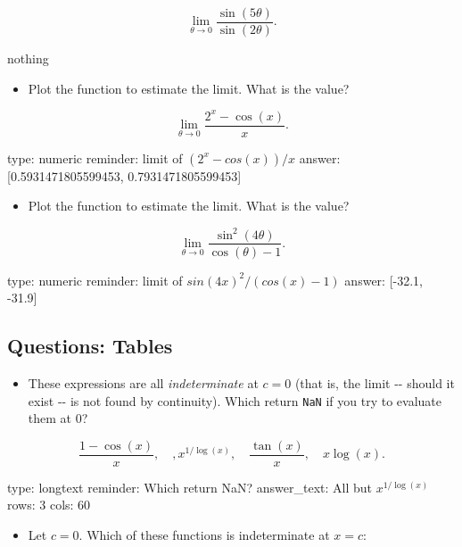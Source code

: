 \documentclass[12pt]{article}
\begin{document}
\[
\lim_{\theta \rightarrow 0} \frac{\sin(5\theta)}{\sin(2\theta)}.
\]

nothing
\begin{itemize}
\itemsep1pt\parskip0pt
\item
  Plot the function to estimate the limit. What is the value?
\end{itemize}

\[
\lim_{\theta \rightarrow 0} \frac{2^x - \cos(x)}{x}.
\]

\begin{answer}
    type: numeric
    reminder: limit of \( (2^x  - cos(x))/x \)
    answer: [0.5931471805599453, 0.7931471805599453]

\end{answer}

\begin{itemize}
\itemsep1pt\parskip0pt
\item
  Plot the function to estimate the limit. What is the value?
\end{itemize}

\[
\lim_{\theta \rightarrow 0} \frac{\sin^2(4\theta)}{\cos(\theta) - 1}.
\]

\begin{answer}
    type: numeric
    reminder: limit of \( sin(4x)^2 / (cos(x) - 1) \)
    answer: [-32.1, -31.9]

\end{answer}

\subsection{Questions: Tables}

\begin{itemize}
\itemsep1pt\parskip0pt
\item
  These expressions are all \emph{indeterminate} at $c=0$ (that is, the
  limit -{}- should it exist -{}- is not found by continuity). Which
  return \texttt{NaN} if you try to evaluate them at $0$?
\end{itemize}

\[
\frac{1-\cos(x)}{x}, \quad, x^{1/\log(x)}, \quad \frac{\tan(x)}{x},\quad x\log(x).
\]

\begin{answer}
type: longtext
reminder: Which return NaN?
answer_text: All but \( x^{1/\log(x)} \) 
rows: 3
cols: 60
\end{answer}

\begin{itemize}
\itemsep1pt\parskip0pt
\item
  Let $c=0$. Which of these functions is indeterminate at $x=c$:
\end{itemize}
\end{document}
